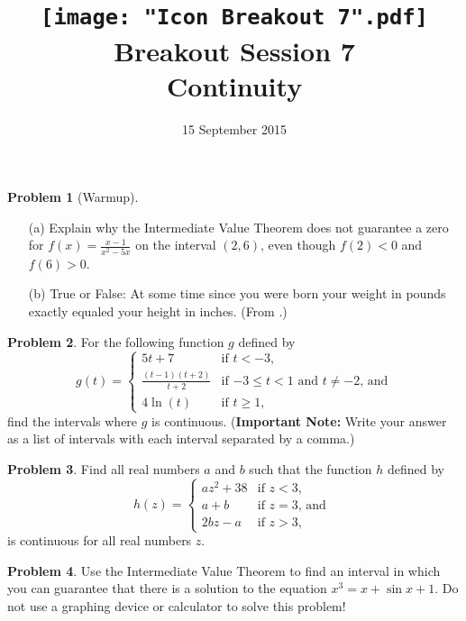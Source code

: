 \documentclass{article}
\title{\texttt{[image: "Icon Breakout 7".pdf]}\\
  Breakout Session 7\\
  Continuity
}
\date{15 September 2015}
\theoremstyle{definition}
\newtheorem{Problem}{Problem}
\begin{document}
\maketitle
\begin{Problem}[Warmup]
  \mbox{}
  \begin{itemize}
    \item[(a)]
      Explain why the Intermediate Value Theorem does not guarantee a zero for $f(x) = \frac{x-1}{x^2 - 5x}$ on the interval $(2,6)$, even though $f(2) < 0$ and $f(6) > 0$.

    \item[(b)]
      True or False: At some time since you were born your weight in pounds exactly equaled your height in inches.
      (From \cite[Question 7]{terrell_goodquestions_2005}.)
  \end{itemize}
\end{Problem}

\begin{Problem}
  For the following function $g$ defined by
  \[
    g(t) =
    \begin{cases}
      5t + 7 & \mbox{if $t < -3$,}\\
      \displaystyle\frac{(t-1)(t+2)}{t+2} & \mbox{if $-3 \leq t < 1$ and $t \neq -2$, and}\\
      4 \ln(t) & \mbox{if $t \geq 1$,}
    \end{cases}
  \]
  find the intervals where $g$ is continuous.
  (\textbf{Important Note:} Write your answer as a list of intervals with each interval separated by a comma.)
\end{Problem}

\begin{Problem}
  Find all real numbers $a$ and $b$ such that the function $h$ defined by
  \[
    h(z) =
    \begin{cases}
      az^2 + 38 &  \mbox{if $z < 3$,}\\
      a + b & \mbox{if $z = 3$, and }\\
      2bz - a &	\mbox{if $z > 3$,}
    \end{cases}
  \]
  is continuous for all real numbers $z$.
\end{Problem}

\begin{Problem}
  Use the Intermediate Value Theorem to find an interval in which you can guarantee that there is a solution to the equation $x^3 = x + \sin x + 1$.
  Do not use a graphing device or calculator to solve this problem!
\end{Problem}

\printbibliography
\end{document}
